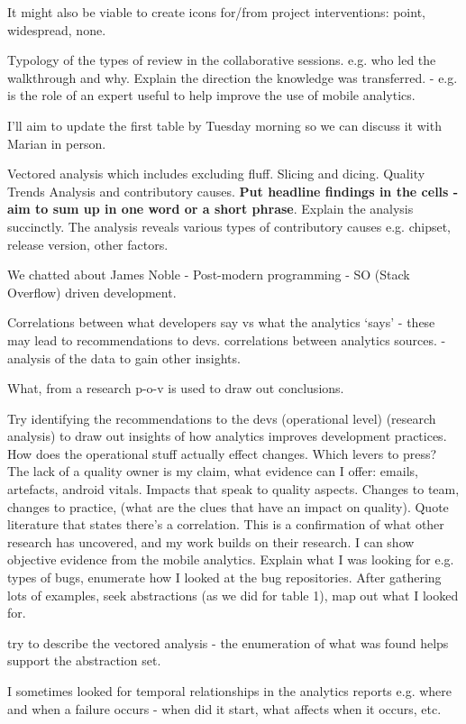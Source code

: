 It might also be viable to create icons for/from project interventions: point, widespread, none.

Typology of the types of review in the collaborative sessions. e.g. who led the walkthrough and why.
Explain the direction the knowledge was transferred. - e.g. is the role of an expert useful to help improve the use of mobile analytics. 

I'll aim to update the first table by Tuesday morning so we can discuss it with Marian in person.

Vectored analysis which includes excluding fluff. Slicing and dicing. 
Quality Trends Analysis and contributory causes. \textbf{Put headline findings in the cells - aim to sum up in one word or a short phrase}. Explain the analysis succinctly. The analysis reveals various types of contributory causes e.g. chipset, release version, other factors. 

We chatted about James Noble - Post-modern programming - SO (Stack Overflow) driven development. 

Correlations between what developers say vs what the analytics ‘says’ - these may lead to recommendations to devs.
correlations between analytics sources. - analysis of the data to gain other insights. 

What, from a research p-o-v is used to draw out conclusions. 

Try identifying the recommendations to the devs (operational level)
(research analysis) to draw out insights of how analytics improves development practices. How does the operational stuff actually effect changes. Which levers to press? 
The lack of a quality owner is my claim, what evidence can I offer: emails, artefacts, android vitals. Impacts that speak to quality aspects. Changes to team, changes to practice, (what are the clues that have an impact on quality). Quote literature that states there’s a correlation. This is a confirmation of what other research has uncovered, and my work builds on their research. I can show objective evidence from the mobile analytics. Explain what I was looking for e.g. types of bugs, enumerate how I looked at the bug repositories. After gathering lots of examples, seek abstractions (as we did for table 1), map out what I looked for. 

try to describe the vectored analysis - the enumeration of what was found helps support the abstraction set. 

I sometimes looked for temporal relationships in the analytics reports e.g. where and when a failure occurs - when did it start, what affects when it occurs, etc. 


